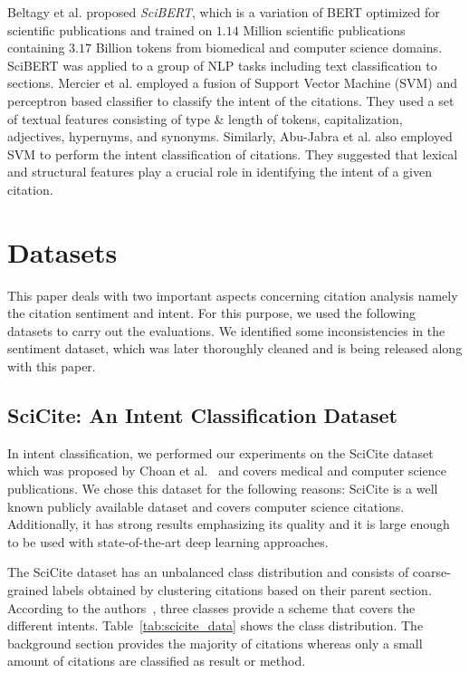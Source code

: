 \documentclass[runningheads]{llncs}
\begin{document}
Beltagy et al. \cite{beltagy-etal-2019-scibert} proposed \textit{SciBERT}, which is a variation of BERT optimized for scientific publications and trained on $1.14$ Million scientific publications containing $3.17$ Billion tokens from biomedical and computer science domains. SciBERT was applied to a group of NLP tasks including text classification to sections. Mercier et al. \cite{mercier2019senticite} employed a fusion of Support Vector Machine (SVM) and perceptron based classifier to classify the intent of the citations. They used a set of textual features consisting of type \& length of tokens, capitalization, adjectives, hypernyms, and synonyms. Similarly, Abu-Jabra et al. \cite{abu-jbara-etal-2013-purpose} also employed SVM to perform the intent classification of citations. They suggested that lexical and structural features play a crucial role in identifying the intent of a given citation. 


\section{Datasets}
This paper deals with two important aspects concerning citation analysis namely the citation sentiment and intent. For this purpose, we used the following datasets to carry out the evaluations. We identified some inconsistencies in the sentiment dataset, which was later thoroughly cleaned and is being released along with this paper. 

\subsection{SciCite: An Intent Classification Dataset}
In intent classification, we performed our experiments on the SciCite dataset which was proposed by Choan et al.~\cite{cohan2019structural} and covers medical and computer science publications. We chose this dataset for the following reasons: SciCite is a well known publicly available dataset and covers computer science citations. Additionally, it has strong results emphasizing its quality and it is large enough to be used with state-of-the-art deep learning approaches. 

The SciCite dataset has an unbalanced class distribution and consists of coarse-grained labels obtained by clustering citations based on their parent section. According to the authors~\cite{cohan2019structural}, three classes provide a scheme that covers the different intents. Table~\ref{tab:scicite_data} shows the class distribution. The background section provides the majority of citations whereas only a small amount of citations are classified as result or method.
\end{document}
